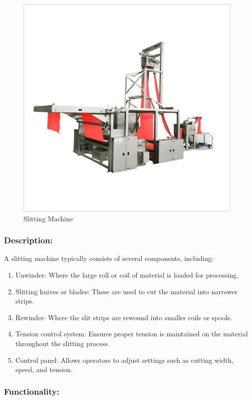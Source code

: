 \begin{figure}[h!]
  \centering
  \includegraphics[width=0.7\linewidth]{figs/production/image2.jpg}
  \caption{Slitting Machine}
  \label{fig:Slitting Machine}
\end{figure}


\subsubsection{Description:}

A slitting machine typically consists of several components, including:

\begin{enumerate}
\item
  Unwinder: Where the large roll or coil of material is loaded for
  processing.
\item
  Slitting knives or blades: These are used to cut the material into
  narrower strips.
\item
  Rewinder: Where the slit strips are rewound into smaller coils or
  spools.
\item
  Tension control system: Ensures proper tension is maintained on the
  material throughout the slitting process.
\item
  Control panel: Allows operators to adjust settings such as cutting
  width, speed, and tension.
\end{enumerate}

\subsubsection{Functionality:}

